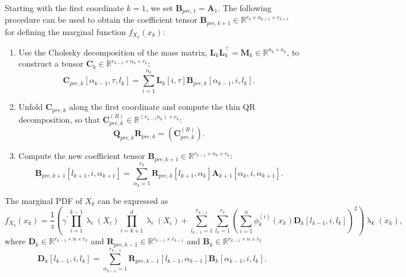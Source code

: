 \begin{prop}
	\label{prob:ForMarg}
	Starting with the first coordinate $k = 1$, we set $\bm{B}_{pre,1} = \bm{A}_1$. The following procedure can be used to obtain the coefficient tensor $\bm{B}_{pre,k+1} \in \mathbb{R}^{r_{k} \times n_{k+1} \times r_{k+1}}$ for defining the marginal function $f_{X_k}(x_k)$:
	\begin{enumerate}
		\item Use the Cholesky decomposition of the mass matrix, $\bm{L}_k \bm{L}_k^\top = \bm{M}_k \in \mathbb{R}^{n_k \times n_k}$, to construct a tensor $\bm{C}_k \in \mathbb{R}^{r_{k-1} \times n_k \times r_k}$:
		\begin{equation}
			\bm{C}_{pre,k}[\alpha_{k-1}, \tau, l_k] = \sum_{i=1}^{n_k} \bm{L}_k[i, \tau] \bm{B}_{pre,k}[\alpha_{k-1}, i, l_k] .
		\end{equation}
		\item Unfold $\bm{C}_{pre,k}$ along the first coordinate and compute the thin QR decomposition, so that $\bm{C}_{pre,k}^{(R)} \in \mathbb{R}^{(r_{k-1} n_k ) \times r_k}$:
		\begin{equation}
			\bm{Q}_{pre,k}\bm{R}_{pre,k} = {(\bm{C}_{pre,k}^{(R)})}.
		\end{equation}
		\item Compute the new coefficient tensor $\bm{B}_{pre, k+1} \in \mathbb{R}^{r_{k-1} \times n_k \times r_k} $:
		\begin{equation}
			\bm{B}_{pre, k+1}[l_{k+1}, i, \alpha_{k+1}] = \sum_{\alpha_{k}=1}^{r_{k}} \bm{R}_{pre,k}[l_{k+1}, \alpha_{k}] \bm{A}_{k+1}[\alpha_{k}, i, \alpha_{k+1}] .
		\end{equation}
	\end{enumerate}
\end{prop}

The marginal PDF of $X_{k}$ can be expressed as
\begin{equation}
	f_{X_k}(x_k) = \frac{1}{z} \left(\gamma^{\prime} \prod_{i=1}^{k-1} \uplambda_i(X_i) \prod_{i=k+1}^{d} \uplambda_i(X_i) + \sum_{l_{k-1}=1}^{r_{k-1}} \sum_{l_k=1}^{r_k} \left(\sum_{i=1}^{n} \phi^{(i)}_k(x_k) \bm{D}_k[l_{k-1},i, l_k] \right)^2 \right) \uplambda_k(x_k),
\end{equation}
where $\bm{D}_k \in \mathbb{R}^{r_{k-1} \times n \times r_k}$ and $\bm{R}_{pre,k-1}\in \mathbb{R}^{r_{k-1} \times r_{k-1}}$ and $\bm{B}_k \in \mathbb{R}^{r_{k-1} \times n \times r_k}$
\begin{equation}
	\bm{D}_k[l_{k-1},i,l_k] = \sum_{\alpha_{k-1}=1}^{r_{k-1}}  \bm{R}_{pre,k-1}[l_{k-1}, \alpha_{k-1}] \bm{B}_k[\alpha_{k-1}, i, l_k].
\end{equation}



